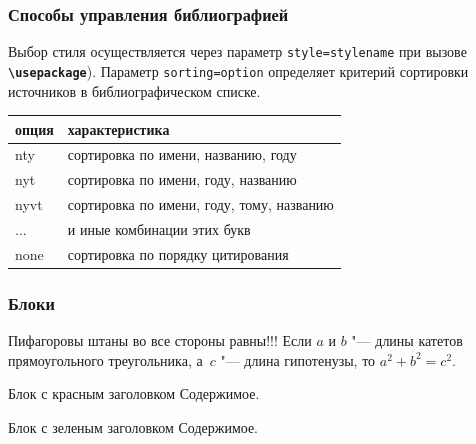 \documentclass[aspectratio=169]{beamer}
\begin{document}
\begin{frame}
\frametitle{Способы управления библиографией}
Выбор стиля осуществляется через параметр \texttt{style=stylename} при вызове \texttt{\textbf{\textbackslash usepackage}}).
Параметр \texttt{sorting=option} определяет критерий сортировки источников в библиографическом списке.

\begin{table}[]
	\begin{tabular}{ll}
\textbf{опция} & \textbf{характеристика}                   \\ \hline
nty            & сортировка по имени, названию, году       \\
nyt            & сортировка по имени, году, названию       \\
nyvt           & сортировка по имени, году, тому, названию \\
...            & и иные комбинации этих букв               \\
none           & сортировка по порядку цитирования        
\end{tabular}
\end{table}
\end{frame}

\begin{frame}
\frametitle{Блоки}
	\begin{theorem}[Пифагора]
		Пифагоровы штаны во все стороны равны!!!
		Если $a$ и $b$ "--- длины катетов прямоугольного треугольника, а~$c$ "--- длина гипотенузы, то $a^2+b^2=c^2$.
	\end{theorem}

	\begin{alertblock}{Блок с красным заголовком}
		Содержимое.
	\end{alertblock}

	\begin{exampleblock}{Блок с зеленым заголовком}
		Содержимое.
	\end{exampleblock}
\end{frame}
\end{document}
